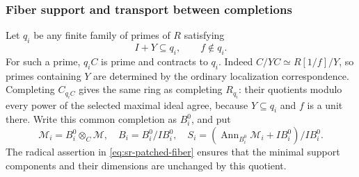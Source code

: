 \subsubsection{Fiber support and transport between completions}
Let $q_i$ be any finite family of primes of $R$ satisfying
\[
                        I+Y\subseteq q_i,\qquad f\notin q_i.
\]
For such a prime, $q_iC$ is prime and contracts to $q_i$.
Indeed $C/YC\simeq R[1/f]/Y$, so primes containing $Y$ are determined
by the ordinary localization correspondence.
Completing $C_{q_iC}$ gives the same ring as completing $R_{q_i}$:
their quotients modulo every power of the selected maximal ideal
agree, because $Y\subseteq q_i$ and $f$ is a unit there.
Write this common completion as $B_i^0$, and put
\[
 \mathcal M_i=B_i^0\otimes_C\mathcal M,\quad
 B_i=B_i^0/IB_i^0,\quad
 S_i=(\operatorname{Ann}_{B_i^0}\mathcal M_i+IB_i^0)/IB_i^0.
\]
The radical assertion in \eqref{eq:sr-patched-fiber} ensures that
the minimal support components and their dimensions are unchanged
by this quotient.

